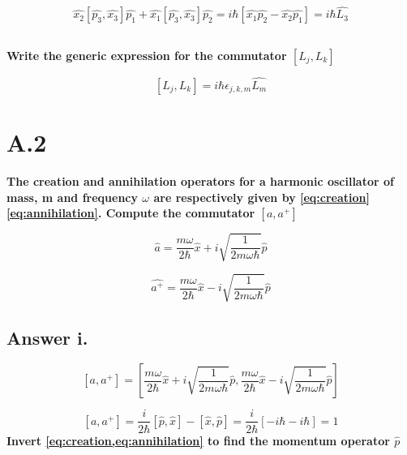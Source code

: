 \documentclass[12pt]{article}
\begin{document}
\begin{equation}
\label{eq:ang4}
\hat{x_{2}}[\hat{p_{3}},\hat{x_{3}}]\hat{p_{1}}+\hat{x_{1}}[\hat{p_{3}},\hat{x_{3}}]\hat{p_{2}}=
i\hbar[\hat{x_{1}}\hat{p_{2}}-\hat{x_{2}}\hat{p_{1}}]=i\hbar{\hat{L_{3}}}
\end{equation}

\subsection*{}
\textbf{Write the generic expression for the commutator $[L_{j},L_{k}]$} 

\begin{equation}
\label{eq:sol1}
[L_{j},L_{k}]=i\hbar{\epsilon_{j,k,m}\hat{L_{m}}}
\end{equation}

\clearpage
\section*{A.2}
\noindent
\textbf{The creation and annihilation operators for a harmonic oscillator of mass, m and frequency $\omega$ are respectively given by 
\cref{eq:creation} \cref{eq:annihilation}. Compute the commutator $[a,a^{+}]$}

\begin{equation}
\label{eq:creation}
\hat{a}=\frac{m\omega}{2\hbar}\hat{x}+i\sqrt{\frac{1}{2m\omega\hbar}}\hat{p}
\end{equation}


\begin{equation}
\label{eq:annihilation}
\hat{a^{+}}=\frac{m\omega}{2\hbar}\hat{x}-i\sqrt{\frac{1}{2m\omega\hbar}}\hat{p}
\end{equation}

\subsection*{Answer i.}

\begin{equation}
\label{eq:com1}
[a,a^{+}]=\left[\frac{m\omega}{2\hbar}\hat{x}+i\sqrt{\frac{1}{2m\omega\hbar}}\hat{p},\frac{m\omega}{2\hbar}\hat{x}
-i\sqrt{\frac{1}{2m\omega\hbar}}\hat{p}\right]
\end{equation}

\begin{equation}
\label{eq:com2}
[a,a^{+}]= \frac{i}{2\hbar} [\hat{p},\hat{x}]-[\hat{x},\hat{p}]=\frac{i}{2\hbar}[-i\hbar-i\hbar]=1
\end{equation}
\noindent
\textbf{ Invert \cref{eq:creation,eq:annihilation} to find the momentum operator  $\hat{p}$}
\end{document}
